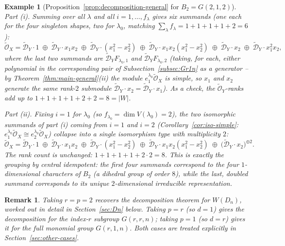 \documentclass[11pt,a4paper]{article}
\newtheorem{remark}[theorem]{Remark}
\newtheorem{example}[theorem]{Example}
\begin{document}
\begin{example}[Proposition~\ref{prop:decomposition-general} for $B_2 = G(2,1,2)$]
\smallskip\noindent\emph{Part (i).} Summing over all $\lambda$ and all
$i=1,\dots,f_\lambda$ gives \emph{six} summands (one each for the four
singleton shapes, two for $\lambda_0$, matching
$\sum_\lambda f_\lambda = 1+1+1+1+2=6$):
\[
  \widetilde{\mathcal O}_X =
  \widetilde{\mathcal D}_Y\cdot 1 \;\oplus\;
  \widetilde{\mathcal D}_Y\cdot x_1x_2 \;\oplus\;
  \widetilde{\mathcal D}_Y\cdot(x_1^2-x_2^2) \;\oplus\;
  \widetilde{\mathcal D}_Y\cdot x_1x_2(x_1^2-x_2^2) \;\oplus\;
  \widetilde{\mathcal D}_Y\cdot x_2 \;\oplus\;
  \widetilde{\mathcal D}_Y\cdot x_1^2x_2,
\]
where the last two summands are
$\widetilde{\mathcal D}_Y F_{\lambda_0,1}$ and
$\widetilde{\mathcal D}_Y F_{\lambda_0,2}$ (taking, for each, either
polynomial in the corresponding pair of Subsection~\ref{subsec:Gr1n}
as a generator -- by Theorem~\ref{thm:main-general}(ii) the module
$e_1^{\lambda_0}\widetilde{\mathcal O}_X$ is simple, so $x_1$ and $x_2$
generate the \emph{same} rank-$2$ submodule
$\widetilde{\mathcal D}_Y\cdot x_2 = \widetilde{\mathcal D}_Y\cdot x_1$).
As a check, the $\widetilde{\mathcal O}_Y$-ranks add up to
$1+1+1+1+2+2 = 8 = |W|$.

\smallskip\noindent\emph{Part (ii).} Fixing $i=1$ for $\lambda_0$ (so
$f_{\lambda_0}=\dim V(\lambda_0)=2$), the two isomorphic summands of
part (i) coming from $i=1$ and $i=2$
(Corollary~\ref{cor:iso-simple}: $e_1^{\lambda_0}\widetilde{\mathcal O}_X \cong
e_2^{\lambda_0}\widetilde{\mathcal O}_X$) collapse into a single
isomorphism type with multiplicity $2$:
\[
  \widetilde{\mathcal O}_X =
  \widetilde{\mathcal D}_Y\cdot 1 \;\oplus\;
  \widetilde{\mathcal D}_Y\cdot x_1x_2 \;\oplus\;
  \widetilde{\mathcal D}_Y\cdot(x_1^2-x_2^2) \;\oplus\;
  \widetilde{\mathcal D}_Y\cdot x_1x_2(x_1^2-x_2^2) \;\oplus\;
  \big(\widetilde{\mathcal D}_Y\cdot x_2\big)^{\oplus 2}.
\]
The rank count is unchanged: $1+1+1+1+2\cdot 2 = 8$. This is exactly
the grouping by central idempotent: the first four summands correspond
to the four $1$-dimensional characters of $B_2$ (a dihedral group of
order $8$), while the last, doubled summand corresponds to its unique
$2$-dimensional irreducible representation.
\end{example}

\begin{remark}
Taking $r=p=2$ recovers the decomposition theorem for $W(D_n)$,
worked out in detail in Section~\ref{sec:Dn} below. Taking $p=r$
(so $d=1$) gives the decomposition for the index-$r$ subgroup
$G(r,r,n)$; taking $p=1$ (so $d=r$) gives it for the full monomial
group $G(r,1,n)$. Both cases are treated explicitly in
Section~\ref{sec:other-cases}.
\end{remark}
\end{document}

